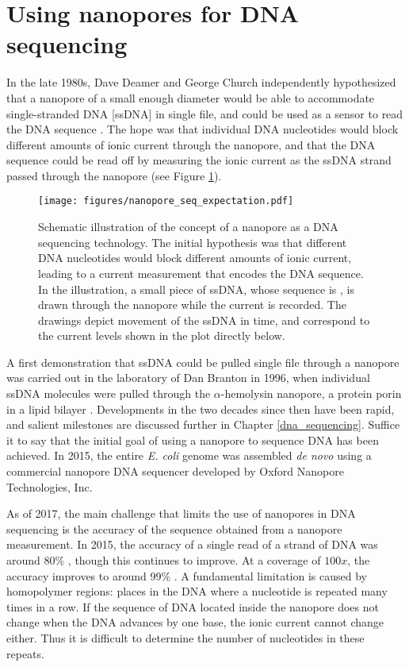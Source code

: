 \section{Using nanopores for DNA sequencing}

In the late 1980s, Dave Deamer and George Church independently hypothesized that a nanopore of a small enough diameter would be able to accommodate single-stranded DNA [ssDNA] in single file, and could be used as a sensor to read the DNA sequence \citep{Branton2008}.  The hope was that individual DNA nucleotides would block different amounts of ionic current through the nanopore, and that the DNA sequence could be read off by measuring the ionic current as the ssDNA strand passed through the nanopore (see Figure \ref{fig:nanopore_seq_expectation}).

\begin{figure}[h]
\begin{centering}
\texttt{[image: figures/nanopore\_seq\_expectation.pdf]}
\caption[Nanopore DNA sequencing concept]{Schematic illustration of the concept of a nanopore as a DNA sequencing technology.  The initial hypothesis was that different DNA nucleotides would block different amounts of ionic current, leading to a current measurement that encodes the DNA sequence.  In the illustration, a small piece of ssDNA, whose sequence is , is drawn through the nanopore while the current is recorded.  The drawings depict movement of the ssDNA in time, and correspond to the current levels shown in the plot directly below.}
\label{fig:nanopore_seq_expectation}
\end{centering}
\end{figure}

A first demonstration that ssDNA could be pulled single file through a nanopore was carried out in the laboratory of Dan Branton in 1996, when individual ssDNA molecules were pulled through the $\alpha$-hemolysin nanopore, a protein porin in a lipid bilayer \citep{Kasianowicz1996}.  Developments in the two decades since then have been rapid, and salient milestones are discussed further in Chapter \ref{dna_sequencing}.  Suffice it to say that the initial goal of using a nanopore to sequence DNA has been achieved.  In 2015, the entire \textit{E. coli} genome was assembled \textit{de novo} using a commercial nanopore DNA sequencer\citep{Loman2015} developed by Oxford Nanopore Technologies, Inc.

As of 2017, the main challenge that limits the use of nanopores in DNA sequencing is the accuracy of the sequence obtained from a nanopore measurement.  In 2015, the accuracy of a single read of a strand of DNA was around 80\% \citep{Loman2015}, though this continues to improve.  At a coverage of $100x$, the accuracy improves to around 99\% \citep{Szalay2015}.  A fundamental limitation is caused by homopolymer regions: places in the DNA where a nucleotide is repeated many times in a row.  If the sequence of DNA located inside the nanopore does not change when the DNA advances by one base, the ionic current cannot change either.  Thus it is difficult to determine the number of nucleotides in these repeats.

